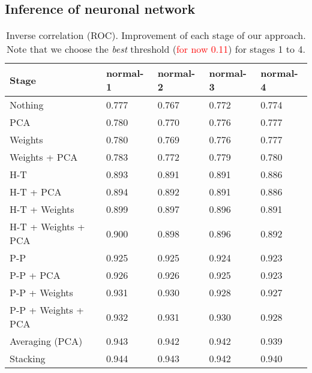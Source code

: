 \documentclass[wcp]{jmlr}
\begin{document}
\subsection{Inference of neuronal network}


\begin{table}[H]
\centering
\caption{Inverse correlation (ROC). Improvement of each stage of our approach. Note that we choose the
         \textit{best} threshold (\textcolor{red}{for now 0.11}) for stages 1 to 4.}
\begin{tabular}{*{5}{l}}
\toprule
Stage               & normal-1 & normal-2 & normal-3 & normal-4 \\
\midrule
Nothing             & 0.777 & 0.767 & 0.772 & 0.774 \\
PCA                 & 0.780 & 0.770 & 0.776 & 0.777 \\
Weights             & 0.780 & 0.769 & 0.776 & 0.777 \\
Weights + PCA       & 0.783 & 0.772 & 0.779 & 0.780 \\
H-T                 & 0.893 & 0.891 & 0.891 & 0.886 \\
H-T + PCA           & 0.894 & 0.892 & 0.891 & 0.886 \\
H-T + Weights       & 0.899 & 0.897 & 0.896 & 0.891 \\
H-T + Weights + PCA & 0.900 & 0.898 & 0.896 & 0.892 \\
P-P                 & 0.925 & 0.925 & 0.924 & 0.923 \\
P-P + PCA           & 0.926 & 0.926 & 0.925 & 0.923 \\
P-P + Weights       & 0.931 & 0.930 & 0.928 & 0.927 \\
P-P + Weights + PCA & 0.932 & 0.931 & 0.930 & 0.928 \\
Averaging (PCA)     & 0.943 & 0.942 & 0.942 & 0.939 \\
Stacking            & 0.944 & 0.943 & 0.942 & 0.940 \\
\bottomrule
\end{tabular}
\end{table}
\end{document}
